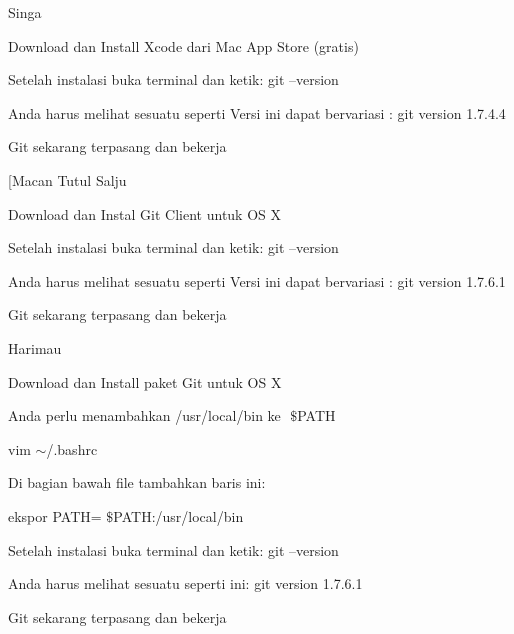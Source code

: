 \vspace{12pt}
\noindent 
 $  $Singa \par
\vspace{12pt}
\noindent 
Download dan Install Xcode dari Mac App Store (gratis) \par
\noindent 
Setelah instalasi buka terminal dan ketik: $  $git --version \par
\noindent 
Anda harus melihat sesuatu seperti $  $Versi $  $ini $  $dapat bervariasi $  $: $  $git version 1.7.4.4 \par
\noindent 
Git sekarang terpasang dan bekerja \par
\vspace{12pt}
\noindent 
 $  $[Macan Tutul Salju \par
\vspace{12pt}
\noindent 
Download dan Instal Git Client untuk OS X  \par
\noindent 
Setelah instalasi buka terminal dan ketik: $  $git --version \par
\noindent 
Anda harus melihat sesuatu seperti $  $Versi $  $ini $  $dapat bervariasi $  $: $  $git version 1.7.6.1 \par
\noindent 
Git sekarang terpasang dan bekerja \par
\vspace{12pt}
\noindent 
 $  $Harimau \par
\vspace{12pt}
\noindent 
Download dan Install paket Git untuk OS X  \par
\noindent 
Anda perlu menambahkan $  $/usr/local/bin $  $ke $  $ $  \$  $PATH \par
\noindent 
vim  $  \sim  $/.bashrc \par
\vspace{12pt}
\noindent 
Di bagian bawah file tambahkan baris ini: \par
\noindent 
ekspor $  $PATH= $  \$  $PATH:/usr/local/bin \par
\vspace{12pt}
\noindent 
Setelah instalasi buka terminal dan ketik: $  $git --version \par
\noindent 
Anda harus melihat sesuatu seperti ini: $  $git version 1.7.6.1 \par
\noindent 
Git sekarang terpasang dan bekerja \par
\vspace{12pt}
\noindent 
